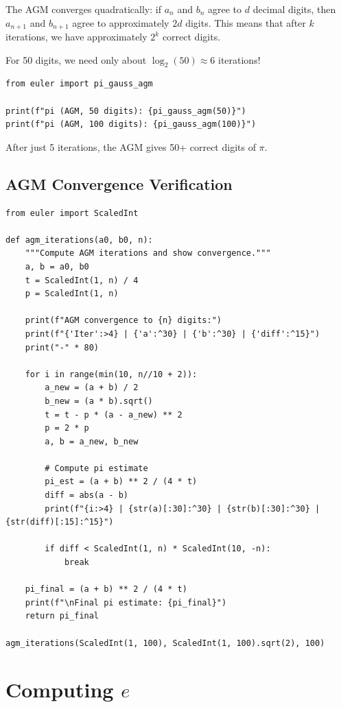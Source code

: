 The AGM converges quadratically: if $a_n$ and $b_n$ agree to $d$ decimal digits,
then $a_{n+1}$ and $b_{n+1}$ agree to approximately $2d$ digits. This means that
after $k$ iterations, we have approximately $2^k$ correct digits.

For 50 digits, we need only about $\log_2(50) \approx 6$ iterations!

\begin{lstlisting}[caption={Pi via AGM}, label=lst:pi_agm]
from euler import pi_gauss_agm

print(f"pi (AGM, 50 digits): {pi_gauss_agm(50)}")
print(f"pi (AGM, 100 digits): {pi_gauss_agm(100)}")
\end{lstlisting}

After just 5 iterations, the AGM gives 50+ correct digits of $\pi$.

\subsection{AGM Convergence Verification}

\begin{lstlisting}[caption={Verifying AGM convergence}, label=lst:agm_verify]
from euler import ScaledInt

def agm_iterations(a0, b0, n):
    """Compute AGM iterations and show convergence."""
    a, b = a0, b0
    t = ScaledInt(1, n) / 4
    p = ScaledInt(1, n)
    
    print(f"AGM convergence to {n} digits:")
    print(f"{'Iter':>4} | {'a':^30} | {'b':^30} | {'diff':^15}")
    print("-" * 80)
    
    for i in range(min(10, n//10 + 2)):
        a_new = (a + b) / 2
        b_new = (a * b).sqrt()
        t = t - p * (a - a_new) ** 2
        p = 2 * p
        a, b = a_new, b_new
        
        # Compute pi estimate
        pi_est = (a + b) ** 2 / (4 * t)
        diff = abs(a - b)
        print(f"{i:>4} | {str(a)[:30]:^30} | {str(b)[:30]:^30} | {str(diff)[:15]:^15}")
        
        if diff < ScaledInt(1, n) * ScaledInt(10, -n):
            break
    
    pi_final = (a + b) ** 2 / (4 * t)
    print(f"\nFinal pi estimate: {pi_final}")
    return pi_final

agm_iterations(ScaledInt(1, 100), ScaledInt(1, 100).sqrt(2), 100)
\end{lstlisting}

\section{Computing $e$}

